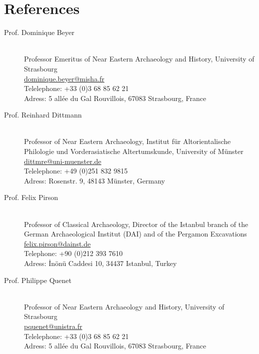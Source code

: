 \section{References}


\begin{multicols}{2}

\begin{description}

  \item[Prof. Dominique Beyer]  \hfill \\ Professor Emeritus of Near Eastern
    Archaeology and History, University of Strasbourg \\
  \href{mailto:dominique.beyer@misha.fr}{dominique.beyer@misha.fr} \\
  Telelephone: +33 (0)3 68 85 62 21 \\
  Adress: 5 allée du Gal Rouvillois, 67083 Strasbourg, France  

  \item[Prof. Reinhard Dittmann]  \hfill \\ Professor of Near Eastern
    Archaeology, Institut für Altorientalische Philologie und Vorderasiatische
    Altertumskunde,  University of Münster
  \href{mailto:dittmre@uni-muenster.de}{dittmre@uni-muenster.de} \\
  Telelephone: +49  (0)251 832 9815 \\
  Adress: Rosenstr. 9, 48143 Münster, Germany

  \item[Prof. Felix Pirson] \hfill \\ Professor of Classical Archaeology, Director of
    the Istanbul branch of the German Archaeological
  Institut (DAI) and of the Pergamon Excavations\\
  \href{mailto:felix.pirson@dainst.de}{felix.pirson@dainst.de} \\
  Telephone: +90 (0)212 393 7610 \\
  Adress: İnönü Caddesi 10,  34437 Istanbul, Turkey

  \item[Prof. Philippe Quenet]  \hfill \\ Professor of Near Eastern
    Archaeology and History, University of Strasbourg \\
  \href{mailto:pquenet@unistra.fr}{pquenet@unistra.fr} \\
  Telelephone: +33 (0)3 68 85 62 21   \\
  Adress: 5 allée du Gal Rouvillois, 67083 Strasbourg, France 



\end{description}
\end{multicols}
